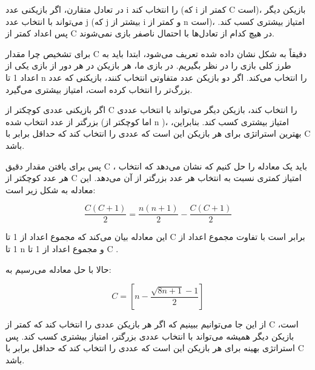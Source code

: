 در تعادل متقارن، اگر بازیکنی عدد i را انتخاب کند (که i کمتر از C است)، بازیکن دیگر می‌تواند با انتخاب عدد j (که j بیشتر از i و کمتر از n است)، امتیاز بیشتری کسب کند. پس اعداد کمتر از C در هیچ کدام از تعادل‌ها با احتمال ناصفر بازی نمی‌شوند.

برای تشخیص چرا مقدار C دقیقاً به شکل نشان داده شده تعریف می‌شود، ابتدا باید به طرز کلی بازی را در نظر بگیریم. در بازی ما، هر بازیکن در هر دور از بازی یکی از اعداد 1 تا n را انتخاب می‌کند. اگر دو بازیکن عدد متفاوتی انتخاب کنند، بازیکنی که عدد بزرگ‌تر را انتخاب کرده است، امتیاز بیشتری می‌گیرد.

اگر بازیکنی عددی کوچکتر از C را انتخاب کند، بازیکن دیگر می‌تواند با انتخاب عددی بزرگتر از عدد انتخاب شده (اما کوچکتر از n )، امتیاز بیشتری کسب کند. بنابراین، بهترین استراتژی برای هر بازیکن این است که عددی را انتخاب کند که حداقل برابر با C باشد.

پس برای یافتن مقدار دقیق C ، باید یک معادله را حل کنیم که نشان می‌دهد که انتخاب هر عدد کوچکتر از C امتیاز کمتری نسبت به انتخاب هر عدد بزرگتر از آن می‌دهد. این معادله به شکل زیر است:

$$
\frac{C (C + 1)}{2} = \frac{n (n + 1)}{2} - \frac{C (C + 1)}{2}
$$

این معادله بیان می‌کند که مجموع اعداد از 1 تا C برابر است با تفاوت مجموع اعداد از 1 تا n و مجموع اعداد از 1 تا C .

حالا با حل معادله می‌رسیم به:

$$
C = [ n - \frac {\sqrt{8n + 1} - 1} {2} ]
$$

از این جا می‌توانیم ببینیم که اگر هر بازیکن عددی را انتخاب کند که کمتر از C است، بازیکن دیگر همیشه می‌تواند با انتخاب عددی بزرگتر، امتیاز بیشتری کسب کند. پس استراتژی بهینه برای هر بازیکن این است که عددی را انتخاب کند که حداقل برابر با C باشد.
